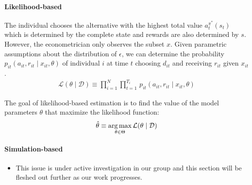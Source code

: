 \paragraph{Likelihood-based} The individual chooses the alternative with the highest total value $a_t^{\pi^*}(s_t)$ which is determined by the complete state and rewards are also determined by $s$. However, the econometrician only observes the subset $x$. Given parametric assumptions about the distribution of $\epsilon$, we can determine the probability $p_{it}(a_{it}, r_{it} \mid x_{it}, \theta)$ of individual $i$ at time $t$ choosing $d_{it}$ and receiving $r_{it}$ given $x_{it}$.
%
\begin{align*}
  \mathcal{L}(\theta\mid\mathcal{D}) \equiv \prod^N_{i= 1} \prod^{T_i}_{t= 1}\, p_{it}(a_{it}, r_{it} \mid x_{it}, \theta)
\end{align*}

\noindent The goal of likelihood-based estimation is to find the value of the model parameters $\theta$ that maximize the likelihood function:
%
\begin{align*}
\hat{\theta} \equiv \operatorname*{arg\,max}_{\theta \in \Theta} \mathcal{L}(\theta\mid\mathcal{D})
\end{align*}

\paragraph{Simulation-based}

\begin{itemize}
  \item This issue is under active investigation in our group and this section will be fleshed out further as our work progresses.
\end{itemize}
